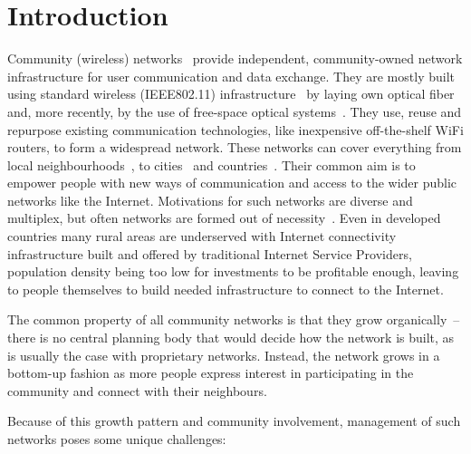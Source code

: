\documentclass[5p,sort&compress]{elsarticle}
\begin{document}
\section{Introduction}

Community (wireless) networks~\cite{Bruno_2005,Frangoudis_2011} provide independent, community-owned network infrastructure for user communication and data exchange.
They are mostly built using standard wireless (IEEE802.11) infrastructure~\cite{Akyildiz_2005} by laying own optical fiber and, more recently, by the use of free-space optical systems~\cite{Mustafa_2013}.
They use, reuse and repurpose existing communication technologies, like inexpensive off-the-shelf WiFi routers, to form a widespread network.
These networks can cover everything from local neighbourhoods~\cite{RedHook_2013}, to cities~\cite{AWMN} and countries~\cite{wlanslovenija_2009, guifi_2003, Funkfeuer_2003, Freifunk_2003}.
Their common aim is to empower people with new ways of communication and access to the wider public networks like the Internet.
Motivations for such networks are diverse and multiplex, but often networks are formed out of necessity~\cite{WNDW_2013}.
Even in developed countries many rural areas are underserved with Internet connectivity infrastructure built and offered by traditional Internet Service Providers, population density being too low for investments to be profitable enough, leaving to people themselves to build needed infrastructure to connect to the Internet.

The common property of all community networks is that they grow organically~-- there is no central planning body that would decide how the network is built, as is usually the case with proprietary networks.
Instead, the network grows in a bottom-up fashion as more people express interest in participating in the community and connect with their neighbours.

Because of this growth pattern and community involvement, management of such networks poses some unique challenges:
\end{document}
